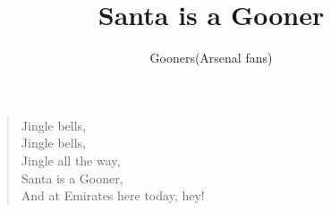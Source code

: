 \documentclass[a4paper,12pt]{article}
\title{Santa is a Gooner}
\author{Gooners(Arsenal fans)}
\date{}
\begin{document}
	
	\maketitle
	
	\begin{verse}
		
		Jingle bells, \\
		Jingle bells, \\
		Jingle all the way, \\
		Santa is a Gooner, \\
		And at Emirates here today, hey!
		
	\end{verse}
	
\end{document}
